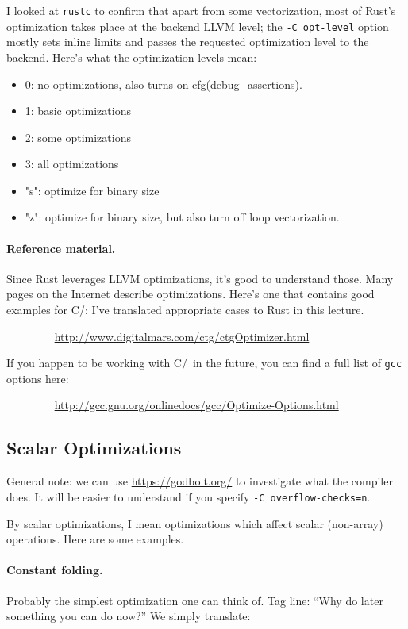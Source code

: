 I looked at \texttt{rustc} to confirm that apart from some vectorization, most of Rust's optimization takes place at the backend LLVM level; the \texttt{-C opt-level} option mostly sets inline limits and passes the requested optimization level to the backend. Here's what the optimization levels mean:

\begin{itemize}[noitemsep]
\item    0: no optimizations, also turns on cfg(debug\_assertions).
\item    1: basic optimizations
\item    2: some optimizations
\item     3: all optimizations
\item    "s": optimize for binary size
\item    "z": optimize for binary size, but also turn off loop vectorization.
\end{itemize}

\paragraph{Reference material.} Since Rust leverages LLVM optimizations, it's good to understand those. Many pages on the Internet describe
optimizations. Here's one that contains good examples for C/\CPP; I've translated appropriate cases to Rust in this lecture.

$\qquad \qquad$ \url{http://www.digitalmars.com/ctg/ctgOptimizer.html}

If you happen to be working with C/\CPP~in the future, you can find a full list of {\tt gcc} options here:

$\qquad \qquad$ \url{http://gcc.gnu.org/onlinedocs/gcc/Optimize-Options.html}

\subsection*{Scalar Optimizations}
General note: we can use \url{https://godbolt.org/} to investigate what the compiler does. It will be easier to understand if you specify \texttt{-C overflow-checks=n}.

By scalar optimizations, I mean optimizations
which affect scalar (non-array) operations. Here are some examples.

\paragraph{Constant folding.} Probably the simplest optimization one can think of.
Tag line: ``Why do later something you can do now?'' We simply translate:

